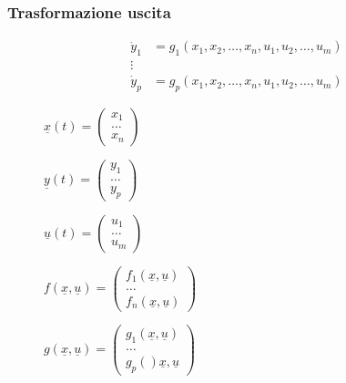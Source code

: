	\subsubsection{Trasformazione uscita}
	\begin{align*}
		\dot y_1 &= g_1(x_1,x_2,\dots,x_n,u_1,u_2,\dots,u_m)\\
		\vdots &\\
		\dot y_p &= g_p(x_1,x_2,\dots,x_n,u_1,u_2,\dots,u_m)
	\end{align*}
	\begin{figure}[H]
		\centering
		\begin{minipage}{0.3\textwidth}
			\centering
			$\underline{x}(t) = \begin{pmatrix} 	x_1 \\ \dots \\	x_n	\end{pmatrix}$
		\end{minipage}
		\begin{minipage}{0.3\textwidth}
			\centering
			$\underline{y}(t) = \begin{pmatrix} 	y_1 \\ \dots \\	y_p	\end{pmatrix}$
		\end{minipage}
		\begin{minipage}{0.3\textwidth}
			\centering
			$\underline{u}(t) = \begin{pmatrix}u_1 \\ \dots \\ u_m\end{pmatrix}$
		\end{minipage}
	\end{figure}
	\begin{figure}[H]
		\centering
		\begin{minipage}{0.4\textwidth}
			\centering
			$f(\underline{x},\underline{u}) = \begin{pmatrix} 	f_1(\underline{x},\underline{u}) \\ \dots \\ f_n(\underline{x},\underline{u})	\end{pmatrix}$
		\end{minipage}
		\begin{minipage}{0.4\textwidth}
			\centering
			$g(\underline{x},\underline{u}) = \begin{pmatrix} 	g_1(\underline{x},\underline{u}) \\ \dots \\ g_p()\underline{x},\underline{u}	\end{pmatrix}$
		\end{minipage}
	\end{figure}
